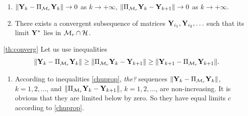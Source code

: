 \documentclass[12pt,a4paper,fleqn,leqno]{article}
\begin{document}
\begin{theorem}
\label{th:converg}
\begin{enumerate}
Let the space $\calM_r$ be closed in topology gererated by norm $\|\cdot\|$. Then
\item $\|\mathbf{Y}_k - \Pi_{\mathcal{M}_r}\mathbf{Y}_k\| \to 0$ as $k \to +\infty$, $\|\Pi_{\mathcal{M}_r}\mathbf{Y}_k - \mathbf{Y}_{k+1}\| \to 0$ as $k \to +\infty$.
\item There exists a convergent subsequence of matrices $\mathbf{Y}_{i_1}, \mathbf{Y}_{i_2}, \ldots$ such that its limit $\mathbf{Y}^*$ lies in $\mathcal{M}_r \cap \mathcal{H}$.
\end{enumerate}
\end{theorem}
\begin{proof2}{\ref{th:converg}}
Let us use inequalities \cite{Chu.etal2003}
\begin{equation}
\label{chuprop}
\|\mathbf{Y}_k - \Pi_{\mathcal{M}_r} \mathbf{Y}_k\| \ge \|\Pi_{\mathcal{M}_r} \mathbf{Y}_k - \mathbf{Y}_{k + 1}\| \ge \|\mathbf{Y}_{k+1} - \Pi_{\mathcal{M}_r} \mathbf{Y}_{k + 1}\|.
\end{equation}

\begin{enumerate}
\item According to inequalities \eqref{chuprop}, \emph{the?} sequences $\|\mathbf{Y}_k - \Pi_{\mathcal{M}_r} \mathbf{Y}_k\|$, $k = 1, 2, \ldots$, and $\|\Pi_{\mathcal{M}_r} \mathbf{Y}_k - \mathbf{Y}_{k + 1}\|$, $k = 1, 2, \ldots$, are non-increasing. It is obvious that they are limited below by zero. So they have equal limits $c$ according to \eqref{chuprop}.


\end{enumerate}
\end{proof2}
\end{document}
